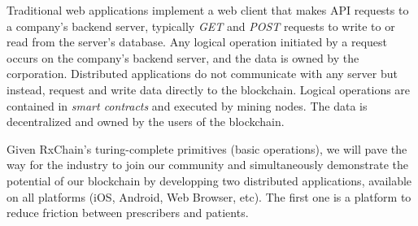 Traditional web applications implement a web client that makes API requests to a company's backend server,
typically \emph{GET} and \emph{POST} requests to write to or read from the server's database.
Any logical operation initiated by a request occurs on the company's backend server, and the data is owned by the corporation.
Distributed applications do not communicate with any server but instead, request and write data directly to the blockchain.
Logical operations are contained in \emph{smart contracts} and executed by mining nodes.
The data is decentralized and owned by the users of the blockchain.

Given RxChain's turing-complete primitives (basic operations), we will pave the way for the industry to join our community
and simultaneously demonstrate the potential of our blockchain by developping two distributed applications, available on
all platforms (iOS, Android, Web  Browser, etc).
The first one is a platform to reduce friction between prescribers and patients.


